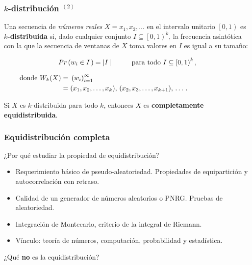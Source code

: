 \documentclass[t, 10pt, mathserif]{beamer}
\begin{document}

\begin{frame}
  \frametitle{$k$-distribución {$^{(2)}$}}

  \begin{definition}
    Una secuencia de \textit{números reales} $X = x_1, x_2, \dots$ en el intervalo unitario $\left[0, 1\right)$ es \textbf{$k$-distribuida} si, dado cualquier conjunto $I \subseteq \left[0, 1\right)^k$, la frecuencia asintótica con la que la secuencia de ventanas de $X$ toma valores en $I$ es igual a su tamaño:
    \pause

    \begin{equation*}
      \begin{aligned}
        Pr \left( w_i \in I\, \right) = \left| I\, \right| \hspace*{1cm} \text{para todo } I \subseteq \left[0, 1\right)^k \text{,}
      \end{aligned}
    \end{equation*}
    \pause

    \vspace{-0.5cm}
    \begin{equation*}
      \hspace{-2.5cm}
      \begin{aligned}
          \text{donde } W_k(X) =\; & \left( w_i \right)_{i = 1}^{\infty} \\
                               =\; & (x_1, x_2, \dots, x_k      ),\, (x_2, x_3, \dots, x_{k + 1}),\, \dots \, \text{.}
      \end{aligned}
    \end{equation*}
    \vspace{-0.3cm}
  \end{definition}
  \pause

  Si $X$ es $k$-distribuida para todo $k$, entonces $X$ es \textbf{completamente equidistribuida}.
\end{frame}


\begin{frame}
  \frametitle{Equidistribución completa}

  ¿Por qué estudiar la propiedad de equidistribución?

  \begin{itemize}
    \item Requerimiento básico de pseudo-aleatoriedad. Propiedades de equipartición y autocorrelación con retraso. \pause
    \item Calidad de un generador de números aleatorios o PNRG. Pruebas de aleatoriedad.\pause %
    \item Integración de Montecarlo, criterio de la integral de Riemann. \pause
    \item Vínculo: teoría de números, computación, probabilidad y estadística.
  \end{itemize}
  \pause

  ¿Qué \textbf{no} es la equidistribución?
\end{frame}
 
\end{document}
